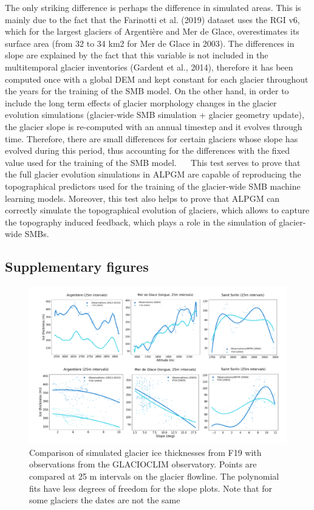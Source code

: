 The only striking difference is perhaps the difference in simulated areas. This is mainly due to the fact that the Farinotti et al. (2019) dataset uses the RGI v6, which for the largest glaciers of Argentière and Mer de Glace, overestimates its surface area (from 32 to 34 km2 for Mer de Glace in 2003). The differences in slope are explained by the fact that this variable is not included in the multitemporal glacier inventories (Gardent et al., 2014), therefore it has been computed once with a global DEM and kept constant for each glacier throughout the years for the training of the SMB model. On the other hand, in order to include the long term effects of glacier morphology changes in the glacier evolution simulations (glacier-wide SMB simulation + glacier geometry update), the glacier slope is re-computed with an annual timestep and it evolves through time. Therefore, there are small differences for certain glaciers whose slope has evolved during this period, thus accounting for the differences with the fixed value used for the training of the SMB model.
 
This test serves to prove that the full glacier evolution simulations in ALPGM are capable of reproducing the topographical predictors used for the training of the glacier-wide SMB machine learning models. Moreover, this test also helps to prove that ALPGM can correctly simulate the topographical evolution of glaciers, which allows to capture the topography induced feedback, which plays a role in the simulation of glacier-wide SMBs. 

\subsection{Supplementary figures}

\begin{figure}[h]
\centering
\includegraphics[width=15cm]{Figures/methods/Figure_S2.png}
\caption{Comparison of simulated glacier ice thicknesses from F19 with observations from the GLACIOCLIM observatory. Points are compared at 25 m intervals on the glacier flowline. The polynomial fits have less degrees of freedom for the slope plots. Note that for some glaciers the dates are not the same}
\end{figure}


